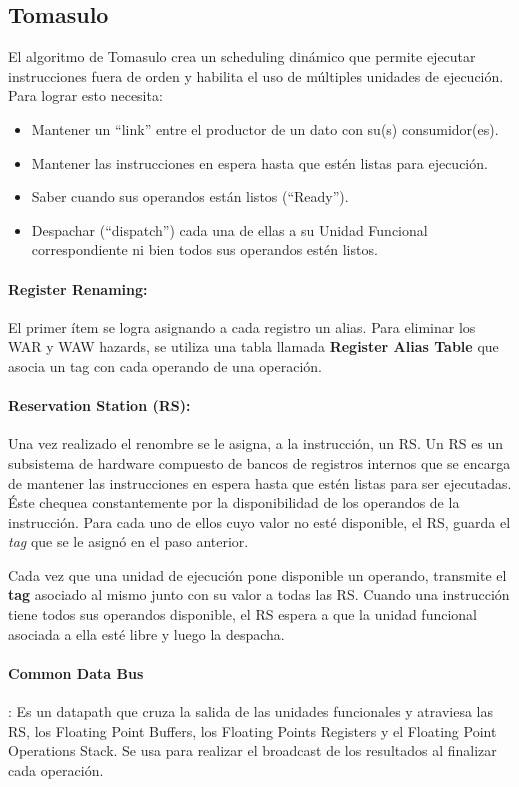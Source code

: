 \subsection{Tomasulo}\label{ilp::tomasulo}
El algoritmo de Tomasulo crea un scheduling dinámico que permite ejecutar instrucciones fuera de orden y habilita el uso de múltiples unidades de ejecución. Para lograr esto necesita:
\begin{itemize}
	\item Mantener un ``link'' entre el productor de un dato con su(s) consumidor(es).
	\item Mantener las instrucciones en espera hasta que estén listas para ejecución.
	\item Saber cuando sus operandos están listos (``Ready'').
	\item Despachar (``dispatch'') cada una de ellas a su Unidad Funcional correspondiente ni bien todos sus operandos estén listos.
\end{itemize}

\paragraph{Register Renaming:} El primer ítem se logra asignando a cada registro un alias. Para eliminar los WAR y WAW hazards, se utiliza una tabla llamada \textbf{Register Alias Table} que asocia un tag con cada operando de una operación.

\paragraph{Reservation Station (RS):} Una vez realizado el renombre se le asigna, a la instrucción, un RS. Un RS es un subsistema de hardware compuesto de bancos de registros internos que se encarga de mantener las instrucciones en espera hasta que estén listas para ser ejecutadas. Éste chequea constantemente por la disponibilidad de los operandos de la instrucción. Para cada uno de ellos cuyo valor no esté disponible, el RS, guarda el \textit{tag} que se le asignó en el paso anterior.

Cada vez que una unidad de ejecución pone disponible un operando, transmite el \textbf{tag} asociado al mismo junto con su valor a todas las RS. Cuando una instrucción tiene todos sus operandos disponible, el RS espera a que la unidad funcional asociada a ella esté libre y luego la despacha.

\paragraph{Common Data Bus}: Es un datapath que cruza la salida de las unidades funcionales y atraviesa las RS, los Floating Point Buffers, los Floating Points Registers y el Floating Point Operations Stack. Se usa para realizar el broadcast de los resultados al finalizar cada operación.

